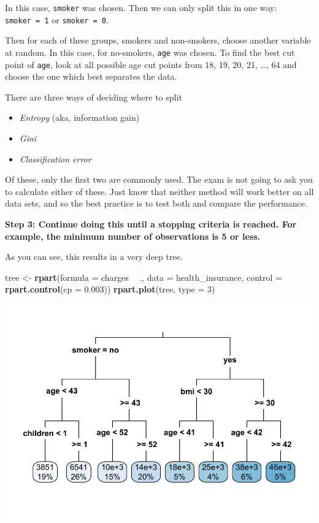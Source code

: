 \documentclass[openany]{book}
\newenvironment{Shaded}{\begin{snugshade}}{\end{snugshade}}
\newcommand{\DataTypeTok}[1]{\textcolor[rgb]{0.13,0.29,0.53}{#1}}
\newcommand{\DecValTok}[1]{\textcolor[rgb]{0.00,0.00,0.81}{#1}}
\newcommand{\FloatTok}[1]{\textcolor[rgb]{0.00,0.00,0.81}{#1}}
\newcommand{\KeywordTok}[1]{\textcolor[rgb]{0.13,0.29,0.53}{\textbf{#1}}}
\newcommand{\NormalTok}[1]{#1}
\newcommand{\OperatorTok}[1]{\textcolor[rgb]{0.81,0.36,0.00}{\textbf{#1}}}
\newcommand{\StringTok}[1]{\textcolor[rgb]{0.31,0.60,0.02}{#1}}
\providecommand{\tightlist}{%
  \setlength{\itemsep}{0pt}\setlength{\parskip}{0pt}}
\begin{document}
In this case, \texttt{smoker} was chosen. Then we can only split this in one way: \texttt{smoker\ =\ 1} or \texttt{smoker\ =\ 0}.

Then for each of these groups, smokers and non-smokers, choose another variable at random. In this case, for no-smokers, \texttt{age} was chosen. To find the best cut point of \texttt{age}, look at all possible age cut points from 18, 19, 20, 21, \ldots, 64 and choose the one which best separates the data.

There are three ways of deciding where to split

\begin{itemize}
\tightlist
\item
  \emph{Entropy} (aka, information gain)
\item
  \emph{Gini}
\item
  \emph{Classification error}
\end{itemize}

Of these, only the first two are commonly used. The exam is not going to ask you to calculate either of these. Just know that neither method will work better on all data sets, and so the best practice is to test both and compare the performance.

\textbf{Step 3: Continue doing this until a stopping criteria is reached. For example, the minimum number of observations is 5 or less.}

As you can see, this results in a very deep tree.

\begin{Shaded}
\begin{Highlighting}[]
\NormalTok{tree <-}\StringTok{ }\KeywordTok{rpart}\NormalTok{(}\DataTypeTok{formula =}\NormalTok{ charges }\OperatorTok{~}\StringTok{  }\NormalTok{., }\DataTypeTok{data =}\NormalTok{ health_insurance,}
              \DataTypeTok{control =} \KeywordTok{rpart.control}\NormalTok{(}\DataTypeTok{cp =} \FloatTok{0.003}\NormalTok{))}
\KeywordTok{rpart.plot}\NormalTok{(tree, }\DataTypeTok{type =} \DecValTok{3}\NormalTok{)}
\end{Highlighting}
\end{Shaded}

\includegraphics{06-tree-based-models_files/figure-latex/unnamed-chunk-4-1.pdf}
\end{document}
